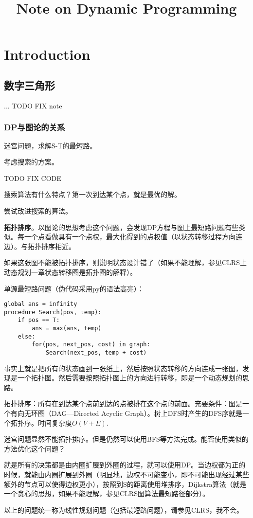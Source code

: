 \documentclass{article}
\begin{document}
\title{Note on Dynamic Programming}
\section{Introduction}
\subsection{数字三角形}
...
TODO FIX note
\subsubsection{DP与图论的关系}
迷宫问题，求解S-T的最短路。

考虑搜索的方案。

TODO FIX CODE

搜索算法有什么特点？第一次到达某个点，就是最优的解。

尝试改进搜索的算法。

\textbf{拓扑排序}。以图论的思想考虑这个问题，会发现DP方程与图上最短路问题有些类似。每一个点看做具有一个点权，最大化得到的点权值（以状态转移过程方向连边）。与拓扑排序相近。

如果这张图不能被拓扑排序，则说明状态设计错了（如果不能理解，参见CLRS上动态规划一章状态转移图是拓扑图的解释）。

单源最短路问题（伪代码采用py的语法高亮）：
\begin{verbatim}
global ans = infinity
procedure Search(pos, temp):
    if pos == T:
        ans = max(ans, temp)
    else:
        for(pos, next_pos, cost) in graph:
            Search(next_pos, temp + cost)
\end{verbatim}
事实上就是把所有的状态画到一张纸上，然后按照状态转移的方向连成一张图，发现是一个拓扑图。然后需要按照拓扑图上的方向进行转移，即是一个动态规划的思路。

拓扑排序：所有在到达某个点前到达的点被排在这个点的前面。充要条件：图是一个有向无环图（DAG---Directed Acyclic Graph）。树上DFS时产生的DFS序就是一个拓扑序。时间复杂度$O(V+E)$.

迷宫问题显然不能拓扑排序。但是仍然可以使用BFS等方法完成。能否使用类似的方法优化这个问题？

就是所有的决策都是由内圈扩展到外圈的过程，就可以使用DP。当边权都为正的时候，就能由内圈扩展到外圈（明显地，边权不可能变小，即不可能出现经过某些额外的节点可以使得边权更小），按照到S的距离使用堆排序，Dijkstra算法（就是一个贪心的思想，如果不能理解，参见CLRS图算法最短路径部分）。

以上的问题统一称为线性规划问题（包括最短路问题），请参见CLRS，我不会。
\end{document}
